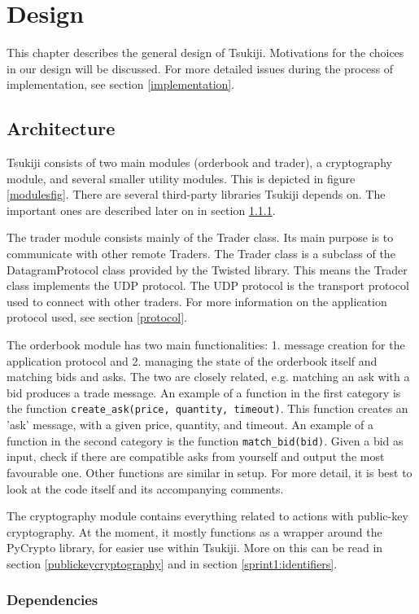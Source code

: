 \section{Design}
This chapter describes the general design of Tsukiji.
Motivations for the choices in our design will be discussed.
For more detailed issues during the process of implementation, see section \ref{implementation}.

\subsection{Architecture}
Tsukiji consists of two main modules (orderbook and trader), a cryptography module, and several smaller utility modules.
This is depicted in figure \ref{modulesfig}.
There are several third-party libraries Tsukiji depends on.
The important ones are described later on in section \ref{dependencies}.

The trader module consists mainly of the Trader class.
Its main purpose is to communicate with other remote Traders.
The Trader class is a subclass of the DatagramProtocol class provided by the Twisted library.
This means the Trader class implements the UDP protocol.
The UDP protocol is the transport protocol used to connect with other traders.
For more information on the application protocol used, see section \ref{protocol}.

The orderbook module has two main functionalities: 1. message creation for the application protocol and 2. managing the state of the orderbook itself and matching bids and asks.
The two are closely related, e.g. matching an ask with a bid produces a trade message.
An example of a function in the first category is the function \texttt{create\_ask(price, quantity, timeout)}.
This function creates an 'ask' message, with a given price, quantity, and timeout.
An example of a function in the second category is the function \texttt{match\_bid(bid)}.
Given a bid as input, check if there are compatible asks from yourself and output the most favourable one.
Other functions are similar in setup.
For more detail, it is best to look at the code itself and its accompanying comments.

The cryptography module contains everything related to actions with public-key cryptography.
At the moment, it mostly functions as a wrapper around the PyCrypto library, for easier use within Tsukiji.
More on this can be read in section \ref{publickeycryptography} and in section \ref{sprint1:identifiers}.

\subsubsection{Dependencies}
\label{dependencies}

